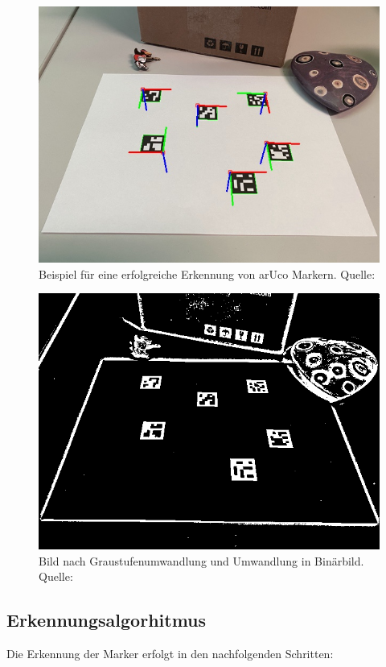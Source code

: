 \begin{figure}
    \caption{Beispiel für eine erfolgreiche Erkennung von arUco Markern. Quelle: \cite[OpenCV]{OpenCVaruco}}\label{fig:aruco1}
    \includegraphics[width = \textwidth/2]{Bilder/singlemarkersaxes.jpg}
    \centering
\end{figure}

\begin{figure}
    \caption{Bild nach Graustufenumwandlung und Umwandlung in Binärbild. Quelle: \cite[OpenCV]{OpenCVaruco}}\label{fig:aruco2}
    \includegraphics[width = \textwidth /2]{Bilder/singlemarkersthresh.png}
    \centering
\end{figure}

\subsection{Erkennungsalgorhitmus}
Die Erkennung der Marker erfolgt in den nachfolgenden Schritten: 


